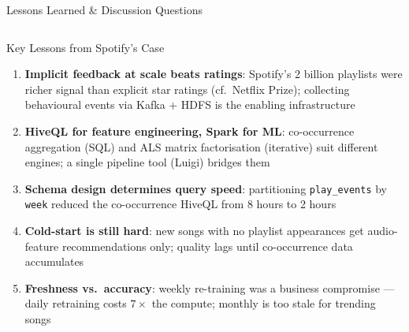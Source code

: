 \documentclass[aspectratio=169,10pt]{beamer}
\begin{document}
\begin{frame}{Lessons Learned \& Discussion Questions}
  \begin{columns}[T]
      \begin{block}{Key Lessons from Spotify's Case}
        \begin{enumerate}
          \item \textbf{Implicit feedback at scale beats ratings}:
                Spotify's 2 billion playlists were richer signal than
                explicit star ratings (cf.\ Netflix Prize); collecting
                behavioural events via Kafka + HDFS is the enabling
                infrastructure
          \item \textbf{HiveQL for feature engineering, Spark for ML}:
                co-occurrence aggregation (SQL) and ALS matrix
                factorisation (iterative) suit different engines;
                a single pipeline tool (Luigi) bridges them
          \item \textbf{Schema design determines query speed}:
                partitioning \texttt{play\_events} by \texttt{week}
                reduced the co-occurrence HiveQL from 8 hours to 2 hours
          \item \textbf{Cold-start is still hard}:
                new songs with no playlist appearances get audio-feature
                recommendations only; quality lags until co-occurrence
                data accumulates
          \item \textbf{Freshness vs.\ accuracy}: weekly re-training was
                a business compromise — daily retraining costs $7\times$
                the compute; monthly is too stale for trending songs
        \end{enumerate}
      \end{block}


\end{columns}
\end{frame}
\end{document}
